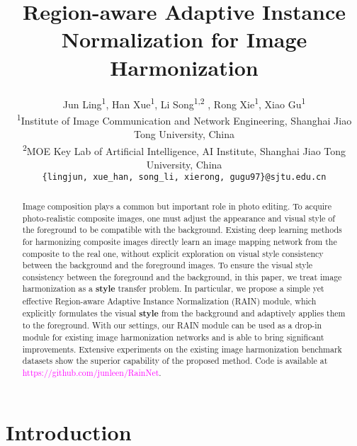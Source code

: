 \documentclass[final]{cvpr}
\begin{document}
\title{Region-aware Adaptive Instance Normalization for Image Harmonization}


\author{Jun Ling\textsuperscript{1}, Han Xue\textsuperscript{1}, Li Song\textsuperscript{1,2 \Letter}, Rong Xie\textsuperscript{1}, Xiao Gu\textsuperscript{1}\\ \textsuperscript{1}Institute of Image Communication and Network Engineering, Shanghai Jiao Tong University, China\\
\textsuperscript{2}MOE Key Lab of Artificial Intelligence, AI Institute, Shanghai Jiao Tong University, China\\
{\tt\small \{lingjun, xue\_han, song\_li, xierong, gugu97\}@sjtu.edu.cn}
}

\maketitle
\pagestyle{empty}
\thispagestyle{empty}




\begin{abstract}
  Image composition plays a common but important role in photo editing. To acquire photo-realistic composite images, one must adjust the appearance and visual style of the foreground to be compatible with the background. Existing deep learning methods for harmonizing composite images directly learn an image mapping network from the composite to the real one, without explicit exploration on visual style consistency between the background and the foreground images. To ensure the visual style consistency between the foreground and the background, in this paper, we treat image harmonization as a \textbf{style} transfer problem. In particular, we propose a simple yet effective Region-aware Adaptive Instance Normalization (RAIN) module, which explicitly formulates the visual \textbf{style} from the background and adaptively applies them to the foreground. With our settings, our RAIN module can be used as a drop-in module for existing image harmonization networks and is able to bring significant improvements. Extensive experiments on the existing image harmonization benchmark datasets show the superior capability of the proposed method. Code is available at \textcolor{magenta}{https://github.com/junleen/RainNet}. 
\end{abstract}


\section{Introduction}
\label{introduction}
\end{document}
